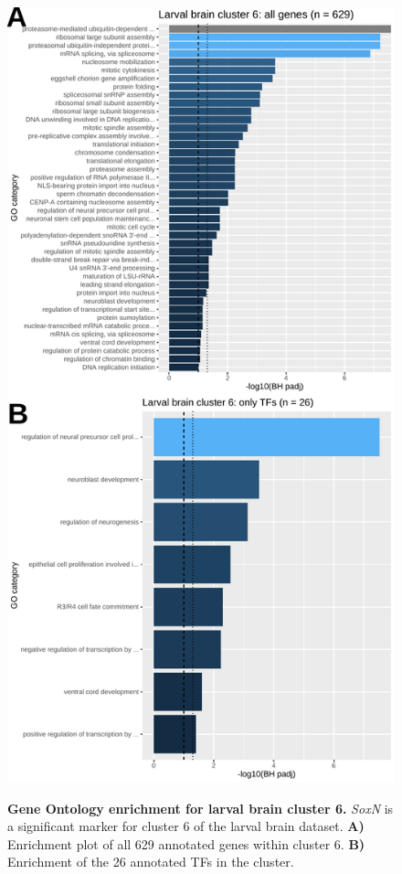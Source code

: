 \documentclass[withindex,glossary]{cam-thesis}
\begin{document}
\setcounter{figure}{15-1}
\begin{figure}[htbp]
\centering
\includegraphics[height=\dimexpr\textheight-53.5pt\relax,keepaspectratio]{figs/Fig15 avalos cluster 6.pdf}
\label{fig15}
\caption{\textbf{Gene Ontology enrichment for larval brain cluster 6.} \emph{SoxN} is a significant marker for cluster 6 of the larval brain dataset. \textbf{A)} Enrichment plot of all 629 annotated genes within cluster 6. \textbf{B)} Enrichment of the 26 annotated TFs in the cluster.}
\end{figure}
\end{document}
